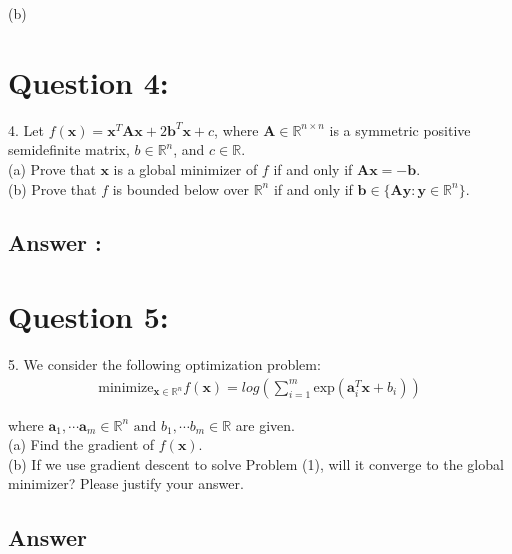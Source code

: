 \documentclass[a4paper,12pt]{article}
\newcommand{\R}{\mathbb{R}}
\begin{document}
(b)


\section*{Question 4:}
4. Let \(f(\bm{x}) = \bm{x}^T\bm{A}\bm{x} + 2\bm{b}^T\bm{x} + c\), where \(\bm{A} \in \R^{n \times n}\) is a symmetric positive semidefinite matrix, \(b \in \R^n\), and \(c \in \R\). \\
(a) Prove that \(\bm{x}\) is a global minimizer of \(f\) if and only if \(\bm{A}\bm{x} = -\bm{b}\). \\
(b) Prove that \(f\) is bounded below over \(\R^n\) if and only if \(\bm{b} \in \{\bm{A}\bm{y}: \bm{y} \in \R^n\}\). \\
\subsection*{Answer :}


\section*{Question 5:}
5. We consider the following optimization problem:
\begin{align}
    \text{minimize}_{\bm{x} \in \R^n} f(\bm{x}) = log\left( \sum_{i = 1}^m \text{exp}(\bm{a}_i^T \bm{x} + b_i)\right)
\end{align}

where \(\bm{a}_1, \cdots \bm{a}_m \in \R^n \text{ and } b_1, \cdots b_m \in \R\) are given. \\

(a) Find the gradient of \(f(\bm{x})\). \\
(b) If we use gradient descent to solve Problem (1), will it converge to the global minimizer? Please justify your answer.


\subsection*{Answer}
\end{document}
